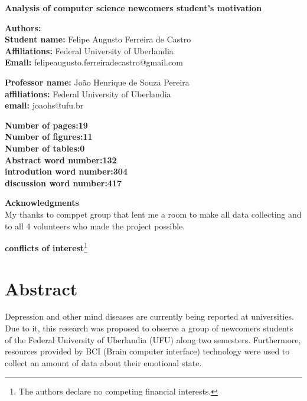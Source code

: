 \documentclass[12pt,openright,a4paper]{article}
\begin{document}
	\linespread{1.5}
 \fontsize{16}{10}\selectfont \centering \textbf{Analysis of computer science newcomers student's motivation} \\
	\fontsize{14}{10}\selectfont {Analysis of student's motivation}\newline

\fontsize{12}{10}
\flushleft
	\textbf{Authors:}\\
	\textbf{Student name:} Felipe Augusto Ferreira de Castro\\
	\textbf{Affiliations:} Federal University of Uberlandia\\
	\textbf{Email:} felipeaugusto.ferreiradecastro@gmail.com \newline
	
\textbf{Professor name:} João Henrique de Souza Pereira\\
\textbf{affiliations:} Federal University of Uberlandia\\
\textbf{email:} joaohs@ufu.br\newline

\textbf{Number of pages:19}\\
\textbf{Number of figures:11}\\
\textbf{Number of tables:0}\\
\textbf{Abstract word number:132}\\
\textbf{introdution word number:304}\\
\textbf{discussion word number:417}\newline
	
\textbf{Acknowledgments}\\	
My thanks to comppet group that lent me a room to make all data collecting and to all 4 volunteers who made the project possible.\newline

\textbf{conflicts of interest}\footnote{The authors declare no competing financial interests.}

\newpage
\tableofcontents
\newpage
\section{Abstract}
Depression and other mind diseases are currently being reported at universities. Due to it, this research was proposed to observe a group of newcomers students of the Federal University of Uberlandia (UFU) along two semesters. Furthermore, resources provided by BCI (Brain computer interface)  technology were used to collect an amount of data about their emotional state.
\end{document}
